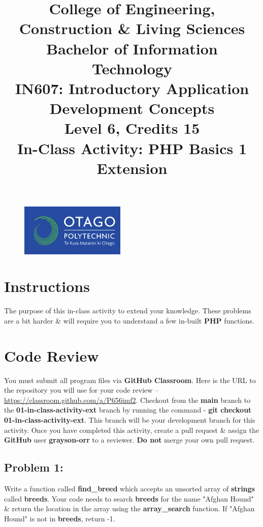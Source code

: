 \documentclass{article}
\author{}
\begin{document}
\begin{figure}
    \centering
    \includegraphics[width=50mm]{../img/logo.png}
\end{figure}

\title{College of Engineering, Construction \& Living Sciences\\Bachelor of Information Technology\\IN607: Introductory Application Development Concepts\\Level 6, Credits 15\\\textbf{In-Class Activity: PHP Basics 1 Extension}}
\date{}
\maketitle
 
\section*{Instructions}
The purpose of this in-class activity to extend your knowledge. These problems are a bit harder \& will require you to understand a few in-built \textbf{PHP} functions.

\section*{Code Review}
You must submit all program files via \textbf{GitHub Classroom}. Here is the URL to the repository you will use for your code review – \href{https://classroom.github.com/a/P656imf2}{https://classroom.github.com/a/P656imf2}. Checkout from the \textbf{main} branch to the \textbf{01-in-class-activity-ext} branch by running the command - \textbf{git checkout 01-in-class-activity-ext}. This branch will be your development branch for this activity. Once you have completed this activity, create a pull request \& assign the \textbf{GitHub} user \textbf{grayson-orr} to a reviewer. \textbf{Do not} merge your own pull request.

\subsection*{Problem 1:} 
Write a function called \textbf{find\_breed} which accepts an unsorted array of \textbf{strings} called \textbf{breeds}. Your code needs to search \textbf{breeds} for the name "Afghan Hound" \& return the location in the array using the \textbf{array\_search} function. If "Afghan Hound" is not in \textbf{breeds}, return -1.
\end{document}

